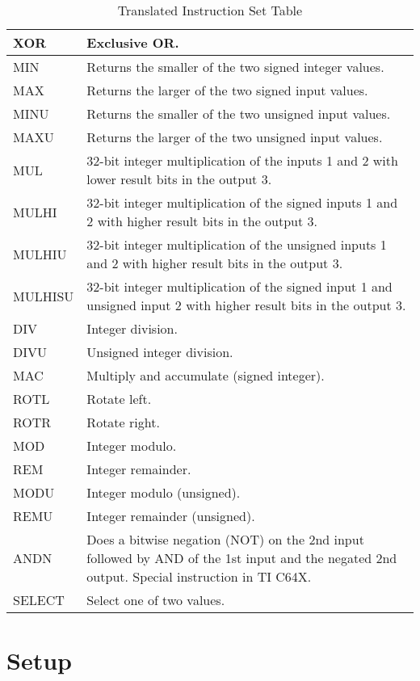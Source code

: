 \begin{table}[htbp]
\begin{tabularx}{\textwidth}{|l|X|}
    XOR & Exclusive OR.  \\ \hline
    MIN & Returns the smaller of the two signed integer values.  \\ \hline
    MAX & Returns the larger of the two signed input values.  \\ \hline
    MINU & Returns the smaller of the two unsigned input values. \\ \hline
    MAXU & Returns the larger of the two unsigned input values. \\ \hline
    MUL & 32-bit integer multiplication of the inputs 1 and 2 with lower result bits in the output 3. \\ \hline
    MULHI & 32-bit integer multiplication of the signed inputs 1 and 2 with higher result bits in the output 3. \\ \hline
    MULHIU & 32-bit integer multiplication of the unsigned inputs 1 and 2 with higher result bits in the output 3. \\ \hline
    MULHISU & 32-bit integer multiplication of the signed input 1 and unsigned input 2 with higher result bits in the output 3. \\ \hline
    DIV & Integer division. \\ \hline
    DIVU & Unsigned integer division. \\ \hline
    MAC & Multiply and accumulate (signed integer). \\ \hline
    ROTL & Rotate left. \\ \hline
    ROTR & Rotate right. \\ \hline
    MOD & Integer modulo. \\ \hline
    REM & Integer remainder. \\ \hline
    MODU & Integer modulo (unsigned). \\ \hline
    REMU & Integer remainder (unsigned). \\ \hline
    ANDN & Does a bitwise negation (NOT) on the 2nd input followed by AND of the 1st input and the negated 2nd output. Special instruction in TI C64X. \\ \hline
    SELECT & Select one of two values. \\ \hline
    \end{tabularx}
    \caption{Translated Instruction Set Table}
\end{table}

\section{Setup}

